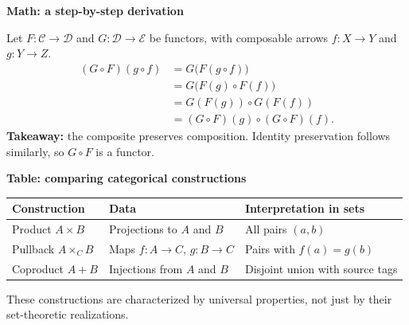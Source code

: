 \documentclass[aspectratio=169]{beamer}
\newcommand{\slideheading}[1]{%
    {\small\bfseries\color{slideMuted}#1\par}
    \vspace{1em}
}
\begin{document}
\begin{frame}
    \slideheading{Math: a step-by-step derivation}
    Let $F:\mathcal{C}\to\mathcal{D}$ and
    $G:\mathcal{D}\to\mathcal{E}$ be functors, with composable
    arrows $f:X\to Y$ and $g:Y\to Z$.
    \begin{align*}
        (G\circ F)(g\circ f)
            &=G\bigl(F(g\circ f)\bigr) \\
            &=G\bigl(F(g)\circ F(f)\bigr) \\
            &=G(F(g))\circ G(F(f)) \\
            &=(G\circ F)(g)\circ(G\circ F)(f).
    \end{align*}
    {\color{slideBlue}\bfseries Takeaway:}
    the composite preserves composition. Identity preservation follows
    similarly, so $G\circ F$ is a functor.
\end{frame}

\begin{frame}
    \slideheading{Table: comparing categorical constructions}
    \centering
    \begingroup
    \renewcommand{\arraystretch}{1.5}
    \setlength{\tabcolsep}{6pt}
    \small
    \begin{tabular}{@{}p{}p{}p{}@{}}
        \hline
        \textbf{\color{slideBlue}Construction} &
        \textbf{\color{slideBlue}Data} &
        \textbf{\color{slideBlue}Interpretation in sets} \\
        \hline
        Product $A\times B$ &
        Projections to $A$ and $B$ &
        All pairs $(a,b)$ \\
        Pullback $A\times_C B$ &
        Maps $f:A\to C$, $g:B\to C$ &
        Pairs with $f(a)=g(b)$ \\
        Coproduct $A+B$ &
        Injections from $A$ and $B$ &
        Disjoint union with source tags \\
        \hline
    \end{tabular}
    \par
    \endgroup
    \vspace{1em}
    {\small These constructions are characterized by universal properties,
    not just by their set-theoretic realizations.}
\end{frame}
\end{document}
